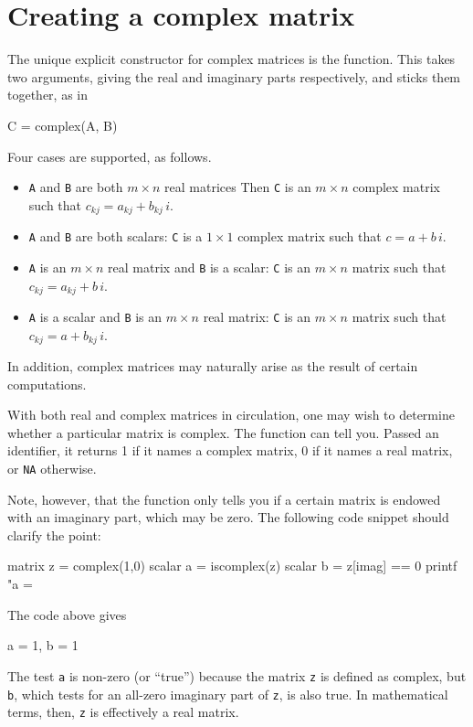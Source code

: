 \section{Creating a complex matrix}
\label{sec:cmplx-create}

The unique explicit constructor for complex matrices is the
 function. This takes two arguments, giving the real
and imaginary parts respectively, and sticks them together, as in
\begin{code}
C = complex(A, B)
\end{code}
Four cases are supported, as follows.
\begin{itemize}
\item \texttt{A} and \texttt{B} are both $m \times n$ real matrices
  Then \texttt{C} is an $m \times n$ complex matrix such that
  $c_{kj} = a_{kj} + b_{kj}\,i$.
\item \texttt{A} and \texttt{B} are both scalars: \texttt{C} is a
  $1 \times 1$ complex matrix such that $c = a + b\,i$.
\item \texttt{A} is an $m \times n$ real matrix and \texttt{B} is a
  scalar: \texttt{C} is an $m \times n$ matrix such that
  $c_{kj} = a_{kj} + b\,i$.
\item \texttt{A} is a scalar and \texttt{B} is an $m \times n$ real
  matrix: \texttt{C} is an $m \times n$ matrix such that
  $c_{kj} = a + b_{kj}\,i$.
\end{itemize}

In addition, complex matrices may naturally arise as the result of
certain computations.

With both real and complex matrices in circulation, one may wish to
determine whether a particular matrix is complex. The function
 can tell you. Passed an identifier, it returns 1
if it names a complex matrix, 0 if it names a real matrix, or
\texttt{NA} otherwise.

Note, however, that the  function only tells you if a
certain matrix is endowed with an imaginary part, which may be
zero. The following code snippet should clarify the point:
\begin{code}
matrix z = complex(1,0)
scalar a = iscomplex(z)
scalar b = z[imag] == 0
printf "a = %
\end{code}
The code above gives
\begin{code}
a = 1, b = 1
\end{code}
The test \texttt{a} is non-zero (or ``true'') because the matrix
\texttt{z} is defined as complex, but \texttt{b}, which tests for an
all-zero imaginary part of \texttt{z}, is also true. In mathematical
terms, then, \texttt{z} is effectively a real matrix.

